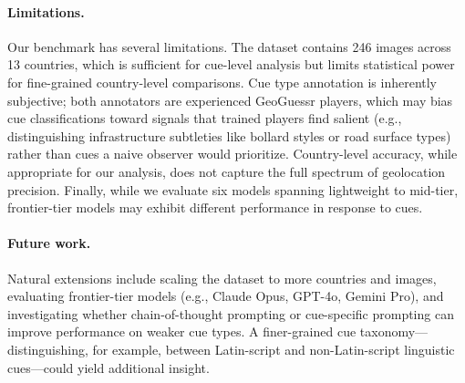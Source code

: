 \documentclass[twoside,11pt]{article}
\begin{document}
\paragraph{Limitations.} Our benchmark has several limitations. The dataset contains 246 images across 13 countries, which is sufficient for cue-level analysis but limits statistical power for fine-grained country-level comparisons. Cue type annotation is inherently subjective; both annotators are experienced GeoGuessr players, which may bias cue classifications toward signals that trained players find salient (e.g., distinguishing infrastructure subtleties like bollard styles or road surface types) rather than cues a naive observer would prioritize. Country-level accuracy, while appropriate for our analysis, does not capture the full spectrum of geolocation precision. Finally, while we evaluate six models spanning lightweight to mid-tier, frontier-tier models may exhibit different performance in response to cues.

\paragraph{Future work.} Natural extensions include scaling the dataset to more countries and images, evaluating frontier-tier models (e.g., Claude Opus, GPT-4o, Gemini Pro), and investigating whether chain-of-thought prompting or cue-specific prompting can improve performance on weaker cue types. A finer-grained cue taxonomy---distinguishing, for example, between Latin-script and non-Latin-script linguistic cues---could yield additional insight.



\end{document}
